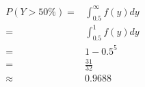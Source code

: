 \documentclass{article}
\begin{document}
        \subsection{}
            \begin{equation*}
                \begin{split}
                    P(Y>50\%)=&\int_{0.5}^{\infty}f(y)dy\\
                        =&\int_{0.5}^{1}f(y)dy\\
                        =&1-0.5^5\\
                        =&\frac{31}{32}\\
                        \approx&0.9688
                \end{split}
            \end{equation*}
\end{document}
